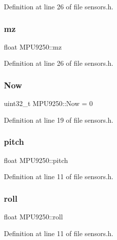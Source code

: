 Definition at line 26 of file sensors.\+h.

\mbox{\label{classMPU9250_af11072922aa71ffb125fe3786f848653}} 
\subsubsection{\texorpdfstring{mz}{mz}}
{\footnotesize\ttfamily float M\+P\+U9250\+::mz}



Definition at line 26 of file sensors.\+h.

\mbox{\label{classMPU9250_a96b7d70d685ed53744c69acc9f7ef1af}} 
\subsubsection{\texorpdfstring{Now}{Now}}
{\footnotesize\ttfamily uint32\+\_\+t M\+P\+U9250\+::\+Now = 0}



Definition at line 19 of file sensors.\+h.

\mbox{\label{classMPU9250_ab3d0117a094b81ac2e07f5c2d68aa5f4}} 
\subsubsection{\texorpdfstring{pitch}{pitch}}
{\footnotesize\ttfamily float M\+P\+U9250\+::pitch}



Definition at line 11 of file sensors.\+h.

\mbox{\label{classMPU9250_ad394d6659aa446adff547feaa4985f94}} 
\subsubsection{\texorpdfstring{roll}{roll}}
{\footnotesize\ttfamily float M\+P\+U9250\+::roll}



Definition at line 11 of file sensors.\+h.

